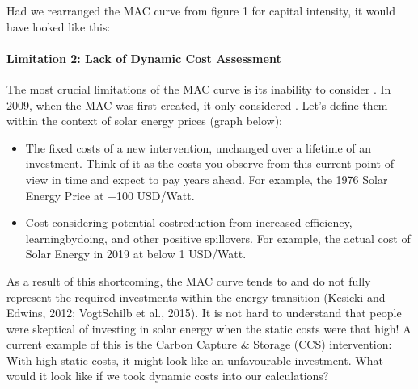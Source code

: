 \documentclass[letterpaper,10pt,english]{jupyterBook}
\begin{document}
\sphinxAtStartPar
Had we re\sphinxhyphen{}arranged the MAC curve from figure 1 for capital intensity, it would have looked like this:

\sphinxAtStartPar
{}


\paragraph{Limitation 2: Lack of Dynamic Cost Assessment}
\label{\detokenize{content/12-environmental/textbook1:limitation-2-lack-of-dynamic-cost-assessment}}
\sphinxAtStartPar
The most crucial limitations of the MAC curve is its inability to consider . In 2009, when the MAC was first created, it only considered . Let’s define them within the context of solar energy prices (graph below):

\sphinxAtStartPar
{}
\begin{itemize}
\item {} 
\sphinxAtStartPar
The fixed costs of a new intervention, unchanged over a lifetime of an investment. Think of it as the costs you observe from this current point of view in time and expect to pay years ahead. For example, the 1976 Solar Energy Price at +100 USD/Watt.

\end{itemize}

\sphinxAtStartPar
{}
\begin{itemize}
\item {} 
\sphinxAtStartPar
Cost considering potential cost\sphinxhyphen{}reduction from increased efficiency, learning\sphinxhyphen{}by\sphinxhyphen{}doing, and other positive spillovers. For example, the actual cost of Solar Energy in 2019 at below 1 USD/Watt.

\end{itemize}

\sphinxAtStartPar
As a result of this shortcoming, the MAC curve tends to  and do not fully represent the required investments within the energy transition (Kesicki and Edwins, 2012; Vogt\sphinxhyphen{}Schilb et al., 2015). It is not hard to understand that people were skeptical of investing in solar energy when the static costs were that high! A current example of this is the Carbon Capture \& Storage (CCS) intervention: With high static costs, it might look like an unfavourable investment. What would it look like if we took dynamic costs into our calculations?
\end{document}
